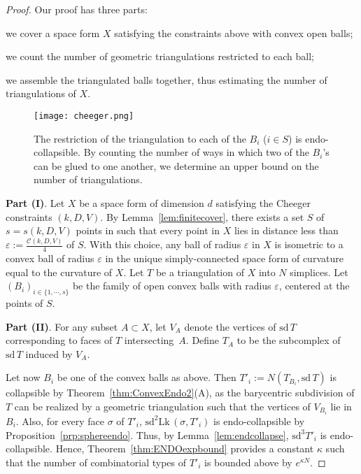 \documentclass[a4paper,11pt]{article}
\theoremstyle{plain}
\theoremstyle{definition}
\newcommand{\e}{\varepsilon}
\newcommand{\Lk}{\mathrm{Lk}\, }
\newcommand{\sd}{\mathrm{sd}\, }
\begin{document}
\begin{proof}
Our proof has three parts:
\begin{compactenum}[\bf (I)]
\item we cover a space form $X$ satisfying the constraints above with convex open balls;
\item we count the number of geometric triangulations restricted to each ball; 
\item we assemble the triangulated balls together, thus estimating the number of triangulations of $X$.
\end{compactenum}

\begin{figure}[htb]
	\centering
  \texttt{[image: cheeger.png]}
 	\caption{\footnotesize The restriction of the triangulation to each of the $B_i$ ($i\in S$) is endo-collapsible. By counting the number of ways in which two of the $B_i$'s can be glued to one another, we determine an upper bound on the number of triangulations.}
	\label{fig:cheeger}
\end{figure}

\noindent \textbf{Part (I)}. Let $X$ be a space form of dimension $d$ satisfying the Cheeger constraints $(k,D,V)$.
By Lemma~\ref{lem:finitecover}, there exists a set $S$ of $s = s(k,D,V)$ points in such that every point in $X$ lies in distance less than $\e:=\frac{\mathcal{C}(k,D,V)}{4}$ of $S$. With this choice, any ball of radius $\e$ in $X$ is isometric to a convex ball of radius $\e$ in the unique simply-connected space form of curvature equal to the curvature of $X$. Let $T$ be a triangulation of $X$ into $N$ simplices. Let $(B_i)_{i \in \{1,\cdots,s \}}$ be the family of open convex balls with radius $\e$, centered at the points of $S$.

\smallskip

\noindent \textbf{Part (II)}. For any subset $A\subset X$, let $V_A$ denote the vertices of $\sd T$  corresponding to faces of $T$ intersecting~$A$. Define $T_{A}$ to be the 
subcomplex of $\sd T$ induced by $V_A$. 

Let now $B_i$ be one of the convex balls as above.  Then $T'_i:=  N(T_{B_i}, \sd T)$ is collapsible by Theorem~\ref{thm:ConvexEndo2}(A),  as the barycentric subdivision of $T$ can be realized by a geometric triangulation such that the vertices of $V_{B_i}$ lie in $B_i$. Also, for every face $\sigma$ of $T'_i$, $\mathrm{sd}^2 \Lk (\sigma,T'_i) $ is endo-collapsible by Proposition~\ref{prp:sphereendo}. Thus, by  Lemma~\ref{lem:endcollapse}, $\mathrm{sd}^3  T'_i$ is endo-collapsible. Hence, Theorem~\ref{thm:ENDOexpbound} provides a constant $\kappa$ such that the number of combinatorial types of $T'_i$ is bounded above by $e^{\kappa N}$.



\end{proof}
\end{document}
